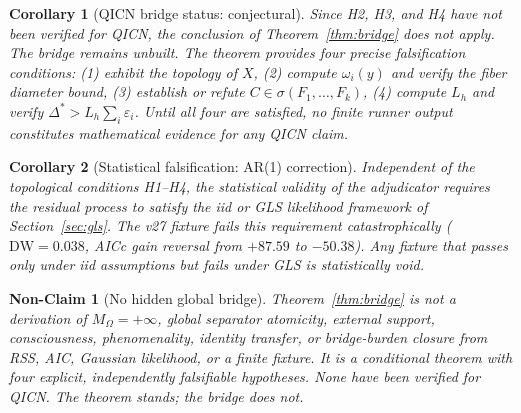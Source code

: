 \documentclass[11pt]{article}
\newtheorem{corollary}{Corollary}
\newtheorem{nonclaim}{Non-Claim}
\begin{document}
\begin{corollary}[QICN bridge status: conjectural]
Since H2, H3, and H4 have not been verified for QICN, the conclusion of Theorem~\ref{thm:bridge} does not apply. The bridge remains unbuilt. The theorem provides four precise falsification conditions: (1) exhibit the topology of $X$, (2) compute $\omega_i(y)$ and verify the fiber diameter bound, (3) establish or refute $C\in\sigma(F_1,\ldots,F_k)$, (4) compute $L_h$ and verify $\Delta^{*}>L_h\sum_i\varepsilon_i$. Until all four are satisfied, no finite runner output constitutes mathematical evidence for any QICN claim.
\end{corollary}

\begin{corollary}[Statistical falsification: AR(1) correction]
Independent of the topological conditions H1--H4, the statistical validity of the adjudicator requires the residual process to satisfy the iid or GLS likelihood framework of Section~\ref{sec:gls}. The v27 fixture fails this requirement catastrophically ($\mathrm{DW}=0.038$, AICc gain reversal from $+87.59$ to $-50.38$). Any fixture that passes only under iid assumptions but fails under GLS is statistically void.
\end{corollary}

\begin{nonclaim}[No hidden global bridge]
Theorem~\ref{thm:bridge} is not a derivation of $M_{\Omega}=+\infty$, global separator atomicity, external support, consciousness, phenomenality, identity transfer, or bridge-burden closure from RSS, AIC, Gaussian likelihood, or a finite fixture. It is a conditional theorem with four explicit, independently falsifiable hypotheses. None have been verified for QICN. The theorem stands; the bridge does not.
\end{nonclaim}
\end{document}
